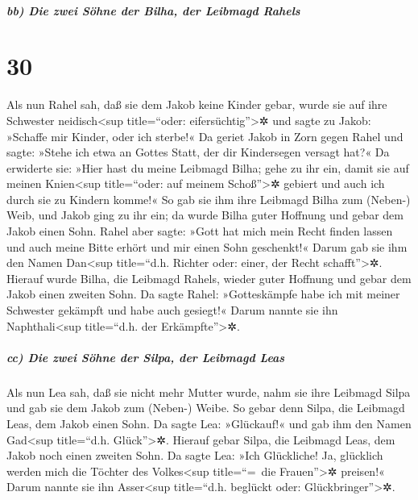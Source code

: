 \hypertarget{bb-die-zwei-suxf6hne-der-bilha-der-leibmagd-rahels}{%
\subparagraph{bb) Die zwei Söhne der Bilha, der Leibmagd
Rahels}\label{bb-die-zwei-suxf6hne-der-bilha-der-leibmagd-rahels}}

\hypertarget{section-29}{%
\section{30}\label{section-29}}

 Als nun Rahel sah, daß sie dem Jakob keine Kinder gebar,
wurde sie auf ihre Schwester neidisch\textless sup title=``oder:
eifersüchtig''\textgreater✲ und sagte zu Jakob: »Schaffe mir Kinder,
oder ich sterbe!«  Da geriet Jakob in Zorn gegen Rahel und
sagte: »Stehe ich etwa an Gottes Statt, der dir Kindersegen versagt
hat?«  Da erwiderte sie: »Hier hast du meine Leibmagd
Bilha; gehe zu ihr ein, damit sie auf meinen Knien\textless sup
title=``oder: auf meinem Schoß''\textgreater✲ gebiert und auch ich durch
sie zu Kindern komme!«  So gab sie ihm ihre Leibmagd Bilha
zum (Neben-) Weib, und Jakob ging zu ihr ein;  da wurde
Bilha guter Hoffnung und gebar dem Jakob einen Sohn. 
Rahel aber sagte: »Gott hat mich mein Recht finden lassen und auch meine
Bitte erhört und mir einen Sohn geschenkt!« Darum gab sie ihm den Namen
Dan\textless sup title=``d.h. Richter oder: einer, der Recht
schafft''\textgreater✲.  Hierauf wurde Bilha, die Leibmagd
Rahels, wieder guter Hoffnung und gebar dem Jakob einen zweiten Sohn.
 Da sagte Rahel: »Gotteskämpfe habe ich mit meiner
Schwester gekämpft und habe auch gesiegt!« Darum nannte sie ihn
Naphthali\textless sup title=``d.h. der Erkämpfte''\textgreater✲.

\hypertarget{cc-die-zwei-suxf6hne-der-silpa-der-leibmagd-leas}{%
\subparagraph{cc) Die zwei Söhne der Silpa, der Leibmagd
Leas}\label{cc-die-zwei-suxf6hne-der-silpa-der-leibmagd-leas}}

 Als nun Lea sah, daß sie nicht mehr Mutter wurde, nahm
sie ihre Leibmagd Silpa und gab sie dem Jakob zum (Neben-) Weibe.
 So gebar denn Silpa, die Leibmagd Leas, dem Jakob einen
Sohn.  Da sagte Lea: »Glückauf!« und gab ihm den Namen
Gad\textless sup title=``d.h. Glück''\textgreater✲. 
Hierauf gebar Silpa, die Leibmagd Leas, dem Jakob noch einen zweiten
Sohn.  Da sagte Lea: »Ich Glückliche! Ja, glücklich
werden mich die Töchter des Volkes\textless sup title=``=~die
Frauen''\textgreater✲ preisen!« Darum nannte sie ihn Asser\textless sup
title=``d.h. beglückt oder: Glückbringer''\textgreater✲.

